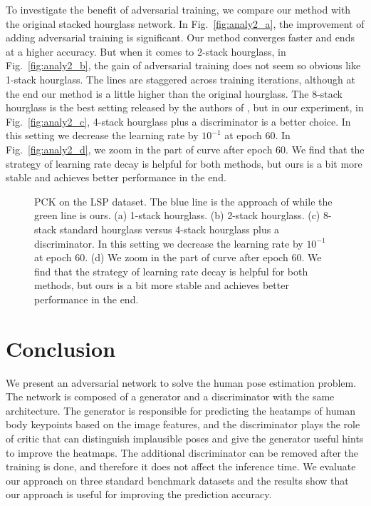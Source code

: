 \documentclass[10pt,twocolumn,letterpaper]{article}
\begin{document}
To investigate the benefit of adversarial training, we compare our method with the original stacked hourglass network. In Fig.~\ref{fig:analy2_a}, the improvement of adding adversarial training is significant. Our method converges faster and ends at a higher accuracy. But when it comes to 2-stack hourglass, in Fig.~\ref{fig:analy2_b}, the gain of adversarial training does not seem so obvious like 1-stack hourglass. The lines are staggered across training iterations, although at the end our method is a little higher than the original hourglass. The 8-stack hourglass is the best setting released by the authors of \cite{NewellYD16}, but in our experiment, in Fig.~\ref{fig:analy2_c}, 4-stack hourglass plus a discriminator is a better choice. In this setting we decrease the learning rate by $10^{-1}$ at epoch 60. In Fig.~\ref{fig:analy2_d}, we zoom in the part of curve after epoch 60. We find that the strategy of learning rate decay is helpful for both methods, but ours is a bit more stable and achieves better performance in the end.
\begin{figure*}[t]
\centering
    \caption{\label{fig:analy2} PCK on the LSP dataset. The blue line is the approach of \cite{NewellYD16} while the green line is ours.  (a) 1-stack hourglass. (b) 2-stack hourglass.
    (c) 8-stack standard hourglass versus 4-stack hourglass plus a discriminator. In this setting we decrease the learning rate by $10^{-1}$ at epoch 60. (d) We zoom in the part of curve after epoch 60. We find that the strategy of learning rate decay is helpful for both methods, but ours is a bit more stable and achieves better performance in the end.}
 \end{figure*}
 
 
\section{Conclusion}

We present an adversarial network to solve the human pose estimation problem. The network is composed of a generator and a discriminator with the same architecture. The generator is responsible for predicting the heatamps of human body keypoints based on the image features, and the discriminator plays the role of critic that can distinguish implausible poses and give the generator useful hints to improve the heatmaps. The additional discriminator can be removed after the training is done, and therefore it does not affect the inference time. We evaluate our approach on three standard benchmark datasets and the results show that our approach is useful for improving the prediction accuracy.



\end{document}
